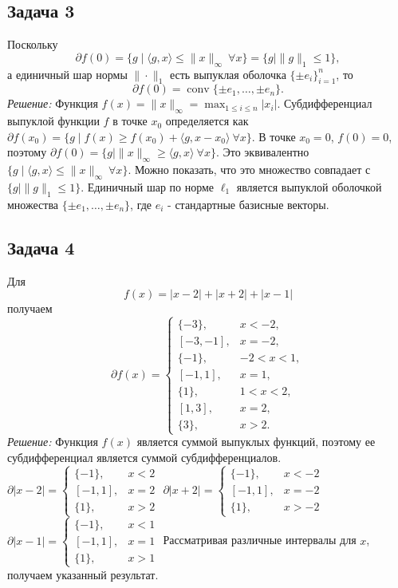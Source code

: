 \documentclass[12pt]{article}
\begin{document}
	\subsection*{Задача 3}
	Поскольку
	\[
	\partial f(0)=\{g\mid\langle g,x\rangle\le\|x\|_\infty\ \forall x\}
	=\{g\mid\|g\|_1\le1\},
	\]
	а единичный шар нормы $\|\cdot\|_1$ есть выпуклая оболочка $\{\pm e_i\}_{i=1}^n$, то
	\[
	\partial f(0)=\operatorname{conv}\{\pm e_1,\dots,\pm e_n\}.
	\]
	\textit{Решение:}
	Функция $f(x) = \|x\|_\infty = \max_{1 \le i \le n} |x_i|$. Субдифференциал выпуклой функции $f$ в точке $x_0$ определяется как $\partial f(x_0) = \{g \mid f(x) \ge f(x_0) + \langle g, x - x_0 \rangle \ \forall x\}$. В точке $x_0 = 0$, $f(0) = 0$, поэтому $\partial f(0) = \{g \mid \|x\|_\infty \ge \langle g, x \rangle \ \forall x\}$. Это эквивалентно $\{g \mid \langle g, x \rangle \le \|x\|_\infty \ \forall x\}$. Можно показать, что это множество совпадает с $\{g \mid \|g\|_1 \le 1\}$. Единичный шар по норме $\ell_1$ является выпуклой оболочкой множества $\{\pm e_1, \dots, \pm e_n\}$, где $e_i$ - стандартные базисные векторы.
	
	\subsection*{Задача 4}
	Для
	\[
	f(x)=|x-2|+|x+2|+|x-1|
	\]
	получаем
	\[
	\partial f(x)=
	\begin{cases}
		\{-3\},&x<-2,\\
		[-3,-1],&x=-2,\\
		\{-1\},&-2<x<1,\\
		[-1,1],&x=1,\\
		\{1\},&1<x<2,\\
		[1,3],&x=2,\\
		\{3\},&x>2.
	\end{cases}
	\]
	\textit{Решение:}
	Функция $f(x)$ является суммой выпуклых функций, поэтому ее субдифференциал является суммой субдифференциалов.
	$\partial |x-2| = \begin{cases} \{-1\}, & x<2 \\ [-1, 1], & x=2 \\ \{1\}, & x>2 \end{cases}$
	$\partial |x+2| = \begin{cases} \{-1\}, & x<-2 \\ [-1, 1], & x=-2 \\ \{1\}, & x>-2 \end{cases}$
	$\partial |x-1| = \begin{cases} \{-1\}, & x<1 \\ [-1, 1], & x=1 \\ \{1\}, & x>1 \end{cases}$
	Рассматривая различные интервалы для $x$, получаем указанный результат.
	
\end{document}
